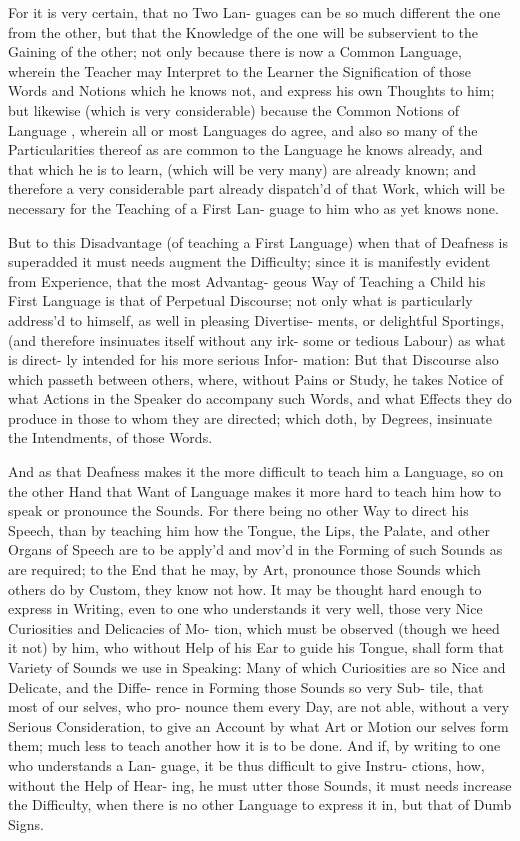 For it is very certain, that no Two Lan-
guages can be so much different the one
from the other, but that the Knowledge of
the one will be subservient to the Gaining
of the other; not only because there is
now a Common Language, wherein the
Teacher may Interpret to the Learner the
Signification of those Words and Notions
which he knows not, and express his own
Thoughts to him; but likewise (which
is very considerable) because the Common
Notions of Language , wherein all or most
Languages do agree, and also so many of
the Particularities thereof as are common
to the Language he knows already, and
that which he is to learn, (which will be
very many) are already known; and
therefore a very considerable part already
dispatch'd of that Work, which will be
necessary for the Teaching of a First Lan-
guage to him who as yet knows none.

But to this Disadvantage (of teaching
a First Language) when that of Deafness
is superadded it must needs augment the
Difficulty; since it is manifestly evident
from Experience, that the most Advantag-
geous Way of Teaching a Child his First
Language is that of Perpetual Discourse;
not only what is particularly address'd to
himself, as well in pleasing Divertise-
ments, or delightful Sportings, (and
therefore insinuates itself without any irk-
some or tedious Labour) as what is direct-
ly intended for his more serious Infor-
mation: But that Discourse also which
passeth between others, where, without
Pains or Study, he takes Notice of what
Actions in the Speaker do accompany such
Words, and what Effects they do produce
in those to whom they are directed; which
doth, by Degrees, insinuate the Intendments,
of those Words.

And as that Deafness makes it the more
difficult to teach him a Language, so on
the other Hand that Want of Language
makes it more hard to teach him how to
speak or pronounce the Sounds. For there
being no other Way to direct his Speech,
than by teaching him how the Tongue,
the Lips, the Palate, and other Organs of
Speech are to be apply'd and mov'd in the
Forming of such Sounds as are required;
to the End that he may, by Art, pronounce
those Sounds which others do by Custom,
they know not how. It may be thought
hard enough to express in Writing, even
to one who understands it very well, those
very Nice Curiosities and Delicacies of Mo-
tion, which must be observed (though
we heed it not) by him, who without
Help of his Ear to guide his Tongue, shall
form that Variety of Sounds we use in
Speaking: Many of which Curiosities
are so Nice and Delicate, and the Diffe-
rence in Forming those Sounds so very Sub-
tile, that most of our selves, who pro-
nounce them every Day, are not able,
without a very Serious Consideration, to
give an Account by what Art or Motion
our selves form them; much less to teach
another how it is to be done. And if,
by writing to one who understands a Lan-
guage, it be thus difficult to give Instru-
ctions, how, without the Help of Hear-
ing, he must utter those Sounds, it must
needs increase the Difficulty, when there
is no other Language to express it in, but
that of Dumb Signs.

